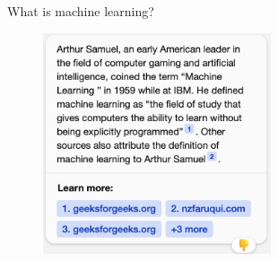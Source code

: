 \documentclass[xcolor={dvipsnames}, handout]{beamer}
\begin{document}

\begin{frame}{What is machine learning?}

\begin{figure}
\centering
\includegraphics[width = 0.6\textwidth]{../assets/arthur-samuel-according-to-bing.png}
\end{figure}

\end{frame}


\end{document}
